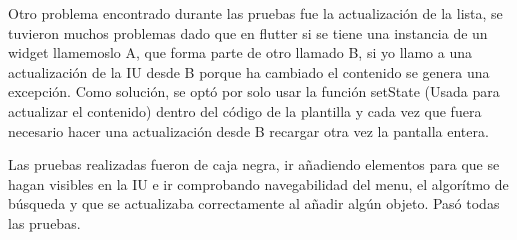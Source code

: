 Otro problema encontrado durante las pruebas fue la actualización de la lista, se tuvieron muchos problemas dado que en flutter si se tiene una instancia de un widget llamemoslo A, que forma parte de otro llamado B, si yo llamo a una actualización de la IU desde B porque ha cambiado el contenido se genera una excepción. Como solución, se optó por solo usar la función setState (Usada para actualizar el contenido) dentro del código de la plantilla y cada vez que fuera necesario hacer una actualización desde B recargar otra vez la pantalla entera.

Las pruebas realizadas fueron de caja negra, ir añadiendo elementos para que se hagan visibles en la IU e ir comprobando navegabilidad del menu, el algorítmo de búsqueda y que se actualizaba correctamente al añadir algún objeto. Pasó todas las pruebas.


